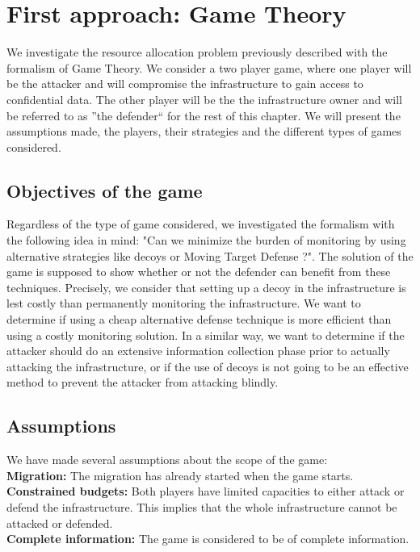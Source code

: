 \section{First approach: Game Theory}

We investigate the resource allocation problem previously described with the formalism of Game Theory.
We consider a two player game, where one player will be the attacker and will compromise the infrastructure to gain access to confidential data. The other player will be the the infrastructure owner and will be referred to as ''the defender`` for the rest of this chapter.
We will present the assumptions made, the players, their strategies and the different types of games considered.

\subsection{Objectives of the game}
Regardless of the type of game considered, we investigated the formalism with the following idea in mind: "Can we minimize the burden of monitoring by using alternative strategies like decoys or Moving Target Defense ?".
The solution of the game is supposed to show whether or not the defender can benefit from these techniques. Precisely, we consider that setting up a decoy in the infrastructure is lest costly than permanently monitoring the infrastructure. We want to determine if using a cheap alternative defense technique is more efficient than using a costly monitoring solution.
In a similar way, we want to determine if the attacker should do an extensive information collection phase prior to actually attacking the infrastructure, or if the use of decoys is not going to be an effective method to prevent the attacker from attacking blindly.



\subsection{Assumptions}
We have made several assumptions about the scope of the game:\\
\textbf{Migration: } The migration has already started when the game starts.\\
\textbf{Constrained budgets: } Both players have limited capacities to either attack or defend the infrastructure.
This implies that the whole infrastructure cannot be attacked or defended.\\
\textbf{Complete information: } The game is considered to be of complete information.\\


